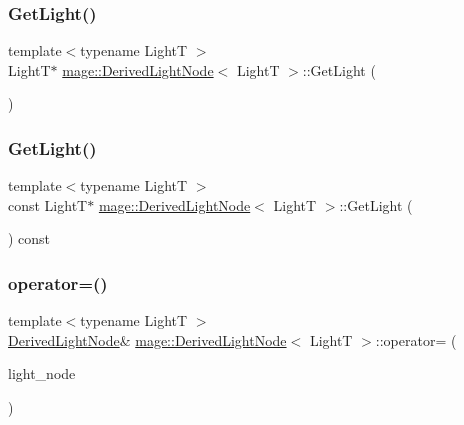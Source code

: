 \subsubsection{\texorpdfstring{Get\+Light()}{GetLight()}\hspace{0.1cm}{\footnotesize\ttfamily [1/2]}}
{\footnotesize\ttfamily template$<$typename LightT $>$ \\
LightT$\ast$ \hyperlink{classmage_1_1_derived_light_node}{mage\+::\+Derived\+Light\+Node}$<$ LightT $>$\+::Get\+Light (\begin{DoxyParamCaption}{ }\end{DoxyParamCaption})}

\hypertarget{classmage_1_1_derived_light_node_ae493c9343e06b5bfe8f74d7cdb79c697}{}\label{classmage_1_1_derived_light_node_ae493c9343e06b5bfe8f74d7cdb79c697} 
\subsubsection{\texorpdfstring{Get\+Light()}{GetLight()}\hspace{0.1cm}{\footnotesize\ttfamily [2/2]}}
{\footnotesize\ttfamily template$<$typename LightT $>$ \\
const LightT$\ast$ \hyperlink{classmage_1_1_derived_light_node}{mage\+::\+Derived\+Light\+Node}$<$ LightT $>$\+::Get\+Light (\begin{DoxyParamCaption}{ }\end{DoxyParamCaption}) const}

\hypertarget{classmage_1_1_derived_light_node_ad4a81ae2a671d6c278c74dead4660949}{}\label{classmage_1_1_derived_light_node_ad4a81ae2a671d6c278c74dead4660949} 
\subsubsection{\texorpdfstring{operator=()}{operator=()}\hspace{0.1cm}{\footnotesize\ttfamily [1/2]}}
{\footnotesize\ttfamily template$<$typename LightT $>$ \\
\hyperlink{classmage_1_1_derived_light_node}{Derived\+Light\+Node}\& \hyperlink{classmage_1_1_derived_light_node}{mage\+::\+Derived\+Light\+Node}$<$ LightT $>$\+::operator= (\begin{DoxyParamCaption}\item[{const \hyperlink{classmage_1_1_derived_light_node}{Derived\+Light\+Node}$<$ LightT $>$ \&}]{light\+\_\+node }\end{DoxyParamCaption})\hspace{0.3cm}{\ttfamily [delete]}}

